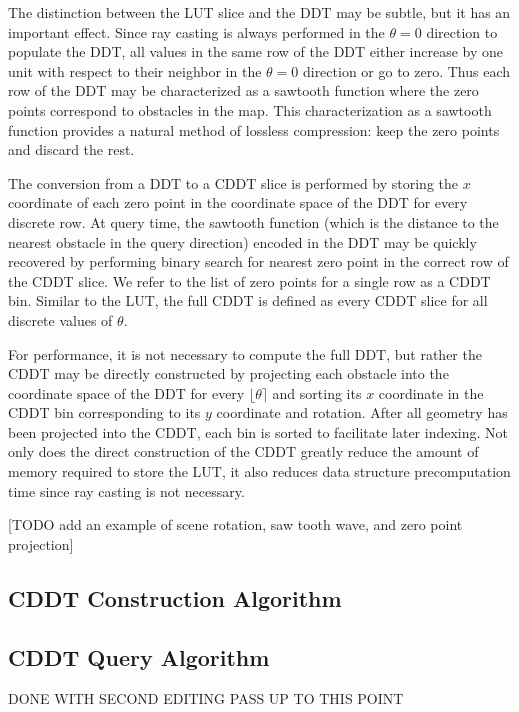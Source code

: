 \documentclass[letterpaper, 10 pt, conference]{ieeeconf}  %
\begin{document}
The distinction between the LUT slice and the DDT may be subtle, but it has an important effect. Since ray casting is always performed in the $\theta=0$ direction to populate the DDT, all values in the same row of the DDT either increase by one unit with respect to their neighbor in the $\theta=0$ direction or go to zero. Thus each row of the DDT may be characterized as a sawtooth function where the zero points correspond to obstacles in the map. This characterization as a sawtooth function provides a natural method of lossless compression: keep the zero points and discard the rest.

The conversion from a DDT to a CDDT slice is performed by storing the $x$ coordinate of each zero point in the coordinate space of the DDT for every discrete row. At query time, the sawtooth function (which is the distance to the nearest obstacle in the query direction) encoded in the DDT may be quickly recovered by performing binary search for nearest zero point in the correct row of the CDDT slice. We refer to the list of zero points for a single row as a CDDT bin. Similar to the LUT, the full CDDT is defined as every CDDT slice for all discrete values of $\theta$.

For performance, it is not necessary to compute the full DDT, but rather the CDDT may be directly constructed by projecting each obstacle into the coordinate space of the DDT for every $\lfloor\theta\rceil$ and sorting its $x$ coordinate in the CDDT bin corresponding to its $y$ coordinate and rotation. After all geometry has been projected into the CDDT, each bin is sorted to facilitate later indexing. Not only does the direct construction of the CDDT greatly reduce the amount of memory required to store the LUT, it also reduces data structure precomputation time since ray casting is not necessary.

[TODO add an example of scene rotation, saw tooth wave, and zero point projection]

\subsection{CDDT Construction Algorithm}

\subsection{CDDT Query Algorithm}


{\color{red}DONE WITH SECOND EDITING PASS UP TO THIS POINT}
\end{document}
